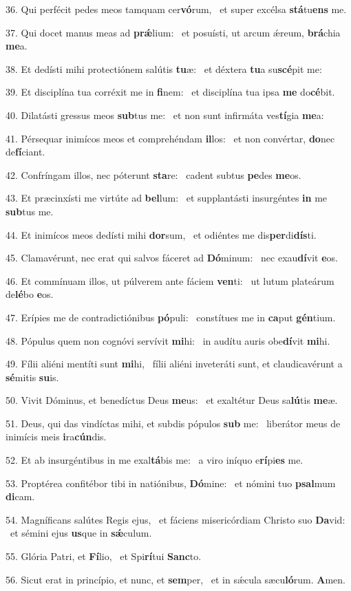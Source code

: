 36. Qui perfécit pedes meos tamquam cer\textbf{vó}rum, \ast\  et super excélsa \textbf{stá}tu\textbf{ens} me.\

37. Qui docet manus meas ad \textbf{prǽ}lium: \ast\  et posuísti, ut arcum ǽreum, \textbf{brá}chia \textbf{me}a.\

38. Et dedísti mihi protectiónem salútis \textbf{tu}æ: \ast\  et déxtera \textbf{tu}a su\textbf{scé}pit me:\

39. Et disciplína tua corréxit me in \textbf{fi}nem: \ast\  et disciplína tua ipsa \textbf{me} do\textbf{cé}bit.\

40. Dilatásti gressus meos \textbf{sub}tus me: \ast\  et non sunt infirmáta ves\textbf{tí}gia \textbf{me}a:\

41. Pérsequar inimícos meos et comprehéndam \textbf{il}los: \ast\  et non convértar, \textbf{do}nec de\textbf{fí}ciant.\

42. Confríngam illos, nec póterunt \textbf{sta}re: \ast\  cadent subtus \textbf{pe}des \textbf{me}os.\

43. Et præcinxísti me virtúte ad \textbf{bel}lum: \ast\  et supplantásti insurgéntes \textbf{in} me \textbf{sub}tus me.\

44. Et inimícos meos dedísti mihi \textbf{dor}sum, \ast\  et odiéntes me dis\textbf{per}di\textbf{dís}ti.\

45. Clamavérunt, nec erat qui salvos fáceret ad \textbf{Dó}minum: \ast\  nec exau\textbf{dí}vit \textbf{e}os.\

46. Et commínuam illos, ut púlverem ante fáciem \textbf{ven}ti: \ast\  ut lutum plateárum de\textbf{lé}bo \textbf{e}os.\

47. Erípies me de contradictiónibus \textbf{pó}puli: \ast\  constítues me in \textbf{ca}put \textbf{gén}tium.\

48. Pópulus quem non cognóvi servívit \textbf{mi}hi: \ast\  in audítu auris obe\textbf{dí}vit \textbf{mi}hi.\

49. Fílii aliéni mentíti sunt \textbf{mi}hi, \ast\  fílii aliéni inveteráti sunt, et claudicavérunt a \textbf{sé}mitis \textbf{su}is.\

50. Vivit Dóminus, et benedíctus Deus \textbf{me}us: \ast\  et exaltétur Deus sa\textbf{lú}tis \textbf{me}æ.\

51. Deus, qui das vindíctas mihi, et subdis pópulos \textbf{sub} me: \ast\  liberátor meus de inimícis meis \textbf{i}ra\textbf{cún}dis.\

52. Et ab insurgéntibus in me exal\textbf{tá}bis me: \ast\  a viro iníquo e\textbf{rí}pi\textbf{es} me.\

53. Proptérea confitébor tibi in natiónibus, \textbf{Dó}mine: \ast\  et nómini tuo \textbf{psal}mum \textbf{di}cam.\

54. Magníficans salútes Regis ejus, \dag\  et fáciens misericórdiam Christo suo \textbf{Da}vid: \ast\  et sémini ejus \textbf{us}que in \textbf{sǽ}culum.\

55. Glória Patri, et \textbf{Fí}lio, \ast\  et Spi\textbf{rí}tui \textbf{Sanc}to.\

56. Sicut erat in princípio, et nunc, et \textbf{sem}per, \ast\  et in sǽcula sæcu\textbf{ló}rum. \textbf{A}men.\

